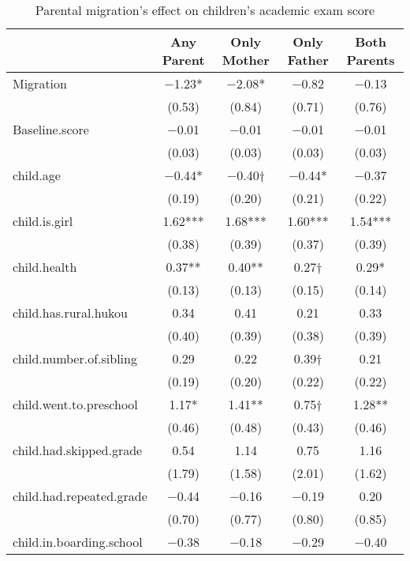 \documentclass[
  man,floatsintext]{apa7}
\begin{document}
\begin{table}

\caption{Parental migration’s effect on children’s academic exam score}
\centering
\begin{tabular}[t]{lcccc}
\toprule
  & Any Parent & Only Mother & Only Father & Both Parents\\
\midrule
Migration & \num{-1.23}* & \num{-2.08}* & \num{-0.82} & \num{-0.13}\\
 & (\num{0.53}) & (\num{0.84}) & (\num{0.71}) & (\num{0.76})\\
Baseline.score & \num{-0.01} & \num{-0.01} & \num{-0.01} & \num{-0.01}\\
 & (\num{0.03}) & (\num{0.03}) & (\num{0.03}) & (\num{0.03})\\
child.age & \num{-0.44}* & \num{-0.40}† & \num{-0.44}* & \num{-0.37}\\
 & (\num{0.19}) & (\num{0.20}) & (\num{0.21}) & (\num{0.22})\\
child.is.girl & \num{1.62}*** & \num{1.68}*** & \num{1.60}*** & \num{1.54}***\\
 & (\num{0.38}) & (\num{0.39}) & (\num{0.37}) & (\num{0.39})\\
child.health & \num{0.37}** & \num{0.40}** & \num{0.27}† & \num{0.29}*\\
 & (\num{0.13}) & (\num{0.13}) & (\num{0.15}) & (\num{0.14})\\
child.has.rural.hukou & \num{0.34} & \num{0.41} & \num{0.21} & \num{0.33}\\
 & (\num{0.40}) & (\num{0.39}) & (\num{0.38}) & (\num{0.39})\\
child.number.of.sibling & \num{0.29} & \num{0.22} & \num{0.39}† & \num{0.21}\\
 & (\num{0.19}) & (\num{0.20}) & (\num{0.22}) & (\num{0.22})\\
child.went.to.preschool & \num{1.17}* & \num{1.41}** & \num{0.75}† & \num{1.28}**\\
 & (\num{0.46}) & (\num{0.48}) & (\num{0.43}) & (\num{0.46})\\
child.had.skipped.grade & \num{0.54} & \num{1.14} & \num{0.75} & \num{1.16}\\
 & (\num{1.79}) & (\num{1.58}) & (\num{2.01}) & (\num{1.62})\\
child.had.repeated.grade & \num{-0.44} & \num{-0.16} & \num{-0.19} & \num{0.20}\\
 & (\num{0.70}) & (\num{0.77}) & (\num{0.80}) & (\num{0.85})\\
child.in.boarding.school & \num{-0.38} & \num{-0.18} & \num{-0.29} & \num{-0.40}\\

\end{tabular}
\end{table}
\end{document}
